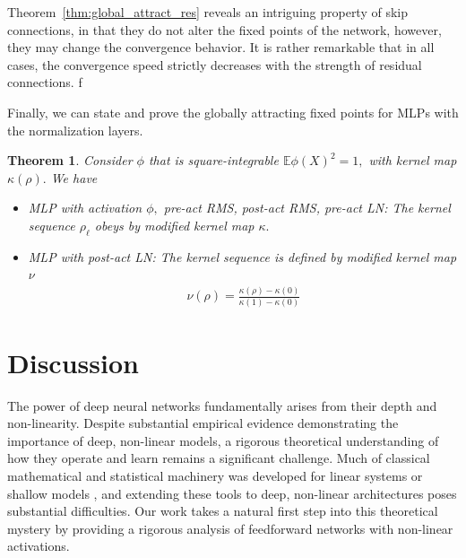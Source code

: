 \documentclass[twoside]{article}
\newcommand{\E}{\mathbb{E}}
\newtheorem{theorem}{Theorem}
\newtheorem{remark}{Remark}
\theoremstyle{definition}
\begin{document}
Theorem~\ref{thm:global_attract_res} reveals an intriguing property of skip connections, in that they do not alter the fixed points of the network, however, they may change the convergence behavior. It is rather remarkable that in all cases, the convergence speed strictly decreases with the strength of residual connections. f

Finally, we can state and prove the globally attracting fixed points for MLPs with the normalization layers.

\begin{theorem}
\label{thm:global_attract_norm}
Consider $\phi$ that is square-integrable $\E \phi(X)^2 =1,$ with kernel map $\kappa(\rho).$ We have 
\begin{itemize}
\item MLP with activation $\phi,$ pre-act RMS, post-act RMS, pre-act LN: The kernel sequence $\rho_\ell$ obeys by modified  kernel map $\kappa.$ 
\item MLP with post-act LN: The kernel sequence is defined by modified  kernel map $\nu$ 
\begin{align*}
    \nu(\rho) = \frac{\kappa(\rho)-\kappa(0)}{\kappa(1)-\kappa(0)}
\end{align*}
\end{itemize}
\end{theorem}



\section{Discussion}



The power of deep neural networks fundamentally arises from their depth and non-linearity. Despite substantial empirical evidence demonstrating the importance of deep, non-linear models, a rigorous theoretical understanding of how they operate and learn remains a significant challenge. Much of classical mathematical and statistical machinery was developed for linear systems or shallow models \citep{hastie2009elements}, and extending these tools to deep, non-linear architectures poses substantial difficulties. Our work takes a natural first step into this theoretical mystery by providing a rigorous analysis of feedforward networks with non-linear activations. 
\end{document}
